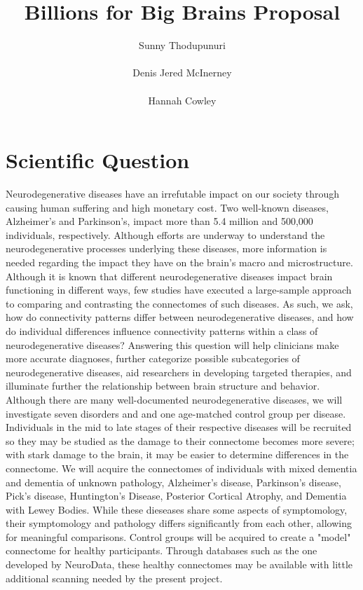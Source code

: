\documentclass[12pt]{article}
\title{\vspace{2in} \textbf{Billions for Big Brains Proposal}}  %
\author{Sunny Thodupunuri \\ \\ Denis Jered McInerney \\ \\ Hannah Cowley}
\date{}
\begin{document}
\maketitle
\thispagestyle{empty}                  %
\newpage                               %

\section{Scientific Question}

	Neurodegenerative diseases have an irrefutable impact on our society through causing human suffering and high monetary cost. Two well-known diseases, Alzheimer’s and Parkinson’s, impact more than 5.4 million and 500,000 individuals, respectively. Although efforts are underway to understand the neurodegenerative processes underlying these diseases, more information is needed regarding the impact they have on the brain’s macro and microstructure. Although it is known that different neurodegenerative diseases impact brain functioning in different ways, few studies have executed a large-sample approach to comparing and contrasting the connectomes of such diseases. As such, we ask, how do connectivity patterns differ between neurodegenerative diseases, and how do individual differences influence connectivity patterns within a class of neurodegenerative diseases? Answering this question will help clinicians make more accurate diagnoses, further categorize possible subcategories of neurodegenerative diseases, aid researchers in developing targeted therapies, and illuminate further the relationship between brain structure and behavior.
    \\
    \indent Although there are many well-documented neurodegenerative diseases, we will investigate seven disorders and and one age-matched control group per disease. Individuals in the mid to late stages of their respective diseases will be recruited so they may be studied as the damage to their connectome becomes more severe; with stark damage to the brain, it may be easier to determine differences in the connectome. We will acquire the connectomes of individuals with mixed dementia and dementia of unknown pathology, Alzheimer's disease, Parkinson's disease, Pick's disease, Huntington's Disease, Posterior Cortical Atrophy, and Dementia with Lewey Bodies. While these dieseases share some aspects of symptomology, their symptomology and pathology differs significantly from each other, allowing for meaningful comparisons. Control groups will be acquired to create a "model" connectome for healthy participants. Through databases such as the one developed by NeuroData, these healthy connectomes may be available with little additional scanning needed by the present project.
\end{document}
